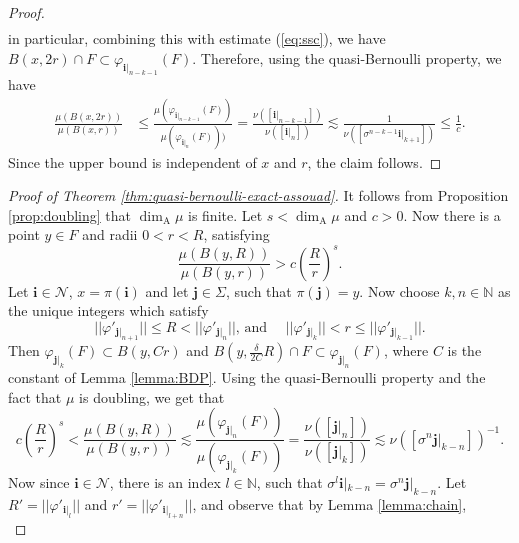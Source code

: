 \documentclass{PRM}
\newcommand{\field}[1]{\mathbb{#1}}
\newcommand{\N}{\field{N}}
\theoremstyle{plain}
\theoremstyle{definition}
\theoremstyle{remark}
\begin{document}
\begin{proof}
\begin{align*}
\end{align*}
in particular, combining this with estimate (\ref{eq:ssc}), we have $B(x,2r)\cap F\subset \varphi_{\mathbf{i}|_{n-k-1}}(F)$. Therefore, using the quasi-Bernoulli property, we have
\begin{align*}
    \frac{\mu(B(x,2r))}{\mu(B(x,r))}&\leq \frac{\mu(\varphi_{\mathbf{i}|_{n-k-1}}(F))}{\mu(\varphi_{\mathbf{i}|_{n}}(F)))}=\frac{\nu([\mathbf{i}|_{n-k-1}])}{\nu([\mathbf{i}|_{n}])}\lesssim \frac{1}{\nu([\sigma^{n-k-1}\mathbf{i}|_{k+1}])}\leq \frac{1}{c}.
\end{align*}
Since the upper bound is independent of $x$ and $r$, the claim follows.
\end{proof}

\begin{proof}[Proof of Theorem \ref{thm:quasi-bernoulli-exact-assouad}]
It follows from Proposition \ref{prop:doubling} that $\dim_{\mathrm{A}}\mu$ is finite. Let $s<\dim_{\mathrm{A}}\mu$ and $c>0$.
Now there is a point $y\in F$ and radii $0<r<R$, satisfying
\begin{equation*}
    \frac{\mu(B(y,R))}{\mu(B(y,r))}> c\left(\frac{R}{r}\right)^s.
\end{equation*}
Let $\mathbf{i}\in \mathcal{N}$, $x=\pi(\mathbf{i})$ and let $\mathbf{j}\in\Sigma$, such that $\pi(\mathbf{j})=y$.  Now choose $k,n\in\N$ as the unique integers which satisfy
\begin{equation*}
    ||\varphi'_{\mathbf{j}|_{n+1}}||\leq R < ||\varphi'_{\mathbf{j}|_{n}}|| \text{, and }\quad ||\varphi'_{\mathbf{j}|_{k}}||< r \leq ||\varphi'_{\mathbf{j}|_{k-1}}||.
\end{equation*} 
Then $\varphi_{\mathbf{j}|_k}(F)\subset B(y,Cr)$ and $B(y,\frac{\delta}{2C}R)\cap F\subset \varphi_{\mathbf{j}|_n}(F)$, where $C$ is the constant of Lemma \ref{lemma:BDP}. Using the quasi-Bernoulli property and the fact that $\mu$ is doubling, we get that
\begin{equation*}
    c\left(\frac{R}{r}\right)^s<\frac{\mu(B(y,R))}{\mu(B(y,r))}\lesssim \frac{\mu(\varphi_{\mathbf{j}|_n}(F))}{\mu(\varphi_{\mathbf{j}|_k}(F))}=\frac{\nu([\mathbf{j}|_n])}{\nu([\mathbf{j}|_k])}\lesssim \nu([\sigma^{n}\mathbf{j}|_{k-n}])^{-1}.
\end{equation*}
Now since $\mathbf{i}\in \mathcal{N}$, there is an index $l\in\N$, such that $\sigma^l\mathbf{i}|_{k-n}=\sigma^{n}\mathbf{j}|_{k-n}$. Let $R'=||\varphi'_{\mathbf{i}|_{l}}||$ and $r'= ||\varphi'_{\mathbf{i}|_{l+n}}||$, and observe that by Lemma \ref{lemma:chain},
\begin{equation*}

\end{equation*}
\end{proof}
\end{document}
